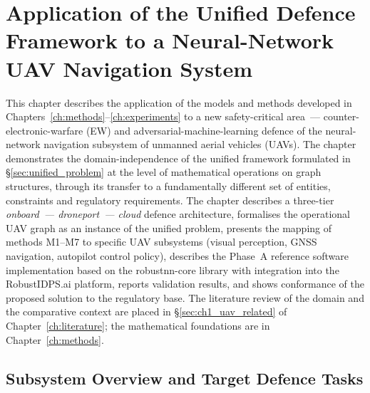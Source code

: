 
\chapter{Application of the Unified Defence Framework to a
Neural-Network UAV Navigation System}
\label{ch:uav}

This chapter describes the application of the models and methods
developed in Chapters~\ref{ch:methods}--\ref{ch:experiments} to a new
safety-critical area~--- counter-electronic-warfare (EW) and
adversarial-machine-learning defence of the neural-network navigation
subsystem of unmanned aerial vehicles (UAVs). The chapter demonstrates
the domain-independence of the unified framework formulated in
\S\ref{sec:unified_problem} at the level of mathematical operations on
graph structures, through its transfer to a fundamentally different
set of entities, constraints and regulatory requirements. The chapter
describes a three-tier \emph{onboard~--- droneport~--- cloud}
defence architecture, formalises the operational UAV graph as an
instance of the unified problem, presents the mapping of methods
\textsf{M1}--\textsf{M7} to specific UAV subsystems (visual perception,
GNSS navigation, autopilot control policy), describes the Phase~A
reference software implementation based on the \textsf{robustnn-core}
library with integration into the \textsf{RobustIDPS.ai} platform,
reports validation results, and shows conformance of the proposed
solution to the regulatory base. The literature review of the domain
and the comparative context are placed in \S\ref{sec:ch1_uav_related}
of Chapter~\ref{ch:literature}; the mathematical foundations are in
Chapter~\ref{ch:methods}.


\section{Subsystem Overview and Target Defence Tasks}
\label{sec:uav_overview}


